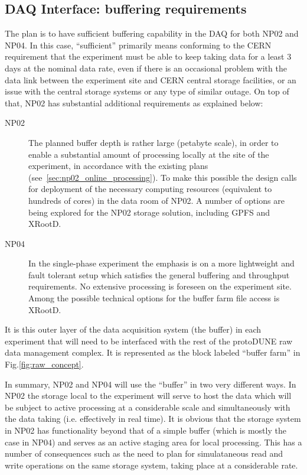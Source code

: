 \documentclass[12pt]{article}
\newcommand{\pd}{protoDUNE\xspace}
\begin{document}
\subsection{DAQ Interface: buffering requirements}
\label{sec:daq_interface}
The plan is to have sufficient buffering capability in the DAQ for both NP02 and NP04. In this case, ``sufficient''
primarily means conforming to the CERN requirement that the experiment must be able to keep taking data for a
least 3 days at the nominal data rate, even if there is an occasional problem with the data link between the
experiment site and CERN central storage facilities, or an issue with the central storage systems or any type of similar outage.
On top of that, NP02 has substantial additional requirements as explained below:
\begin{description}

\item[NP02] The planned buffer depth is rather large (petabyte scale), in order to enable a substantial amount of
processing locally at the site of the experiment, in accordance with the existing plans (see~\ref{sec:np02_online_processing}).
 To make this possible the design calls
for deployment of the necessary computing resources (equivalent to hundreds of cores) in the data room of NP02. A number of options are being explored
for the NP02  storage solution, including GPFS and XRootD.

\item[ NP04] In the single-phase experiment the emphasis is on a more lightweight and fault tolerant setup which satisfies the general buffering and throughput requirements.
No extensive processing is foreseen on the experiment site. Among the possible technical options for the buffer farm file access is XRootD.
\end{description}

\noindent
It is this outer layer of the data acquisition system (the buffer) in each experiment that will need to be interfaced with
the rest of the \pd raw data management complex.  It is represented as the block labeled ``buffer farm'' in Fig.\ref{fig:raw_concept}.

In summary, NP02 and NP04 will use the ``buffer'' in two very different ways.  In NP02
the storage local to the experiment will serve to host the data which will be subject to active processing at a considerable scale
and simultaneously with the data taking (i.e. effectively in real time).
It is obvious that the storage system in NP02 has functionality beyond that of a simple buffer (which is mostly the case in NP04)
and serves as an active staging area for local processing. This has a number of consequences such as the need to plan
for simulataneous read and write operations on the same storage system, taking place at a considerable rate.
\end{document}
